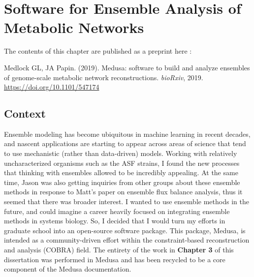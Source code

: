 \documentclass[11pt,twocolumn,notitlepage,openany,twoside]{book}
\begin{document}
\chapter{Software for Ensemble Analysis of Metabolic Networks}
\begin{refsection}

  The contents of this chapter are published as a preprint here \cite{Medlock547174}:

  \medskip\noindent
  Medlock GL, JA Papin. (2019). Medusa: software to build and analyze ensembles of genome-scale metabolic network reconstructions. \textit{bioRxiv}, 2019. \url{https://doi.org/10.1101/547174}

\section{Context}

Ensemble modeling has become ubiquitous in machine learning in recent decades, and nascent applications are starting to appear across areas of science that tend to use mechanistic (rather than data-driven) models. Working with relatively uncharacterized organisms such as the ASF strains, I found the new processes that thinking with ensembles allowed to be incredibly appealing. At the same time, Jason was also getting inquiries from other groups about these ensemble methods in response to Matt's paper on ensemble flux balance analysis, thus it seemed that there was broader interest. I wanted to use ensemble methods in the future, and could imagine a career heavily focused on integrating ensemble methods in systems biology. So, I decided that I would turn my efforts in graduate school into an open-source software package. This package, Medusa, is intended as a community-driven effort within the constraint-based reconstruction and analysis (COBRA) field. The entirety of the work in \textbf{Chapter 3} of this dissertation was performed in Medusa and has been recycled to be a core component of the Medusa documentation.


\end{refsection}
\end{document}
